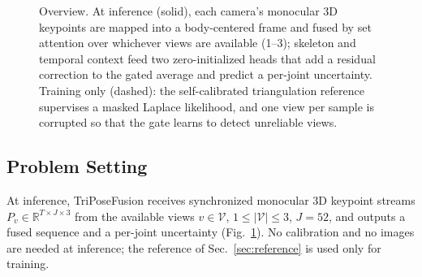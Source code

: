 \documentclass[journal]{IEEEtran}
\newcommand{\method}{TriPoseFusion}
\begin{document}
\begin{figure}[t]
\caption{Overview. At inference (solid), each camera's monocular 3D keypoints are mapped into a body-centered frame and fused by set attention over whichever views are available (1--3); skeleton and temporal context feed two zero-initialized heads that add a residual correction to the gated average and predict a per-joint uncertainty. Training only (dashed): the self-calibrated triangulation reference supervises a masked Laplace likelihood, and one view per sample is corrupted so that the gate learns to detect unreliable views.}
\label{fig:pipeline}
\end{figure}

\subsection{Problem Setting}
At inference, \method{} receives synchronized monocular 3D keypoint streams $P_v \in \mathbb{R}^{T\times J\times 3}$ from the available views $v \in \mathcal{V}$, $1 \le |\mathcal{V}| \le 3$, $J{=}52$, and outputs a fused sequence and a per-joint uncertainty (Fig.~\ref{fig:pipeline}). No calibration and no images are needed at inference; the reference of Sec.~\ref{sec:reference} is used only for training.
\end{document}
